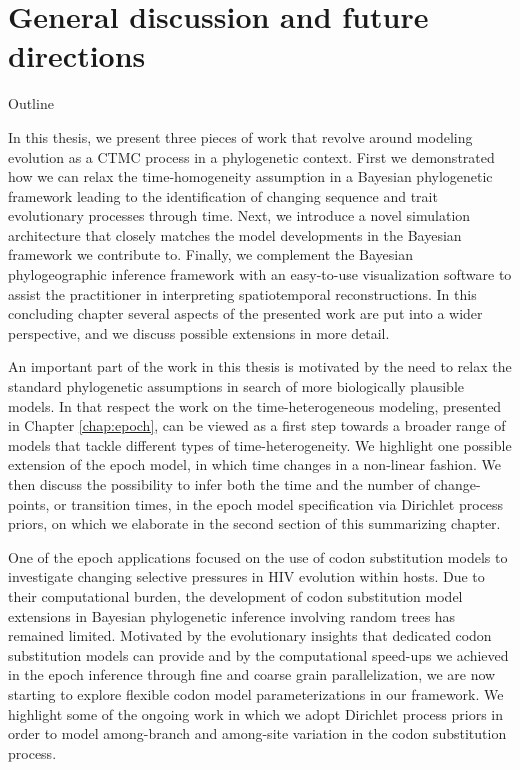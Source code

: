 \chapter{General discussion and future directions}

\begin{remark}{Outline}

In this thesis, we present three pieces of work that revolve around modeling evolution as a CTMC process in a phylogenetic context. 
First we demonstrated how we can relax the time-homogeneity assumption in a Bayesian phylogenetic framework leading to the identification of changing sequence and trait evolutionary processes through time.
Next, we introduce a novel simulation architecture that closely matches the model developments in the Bayesian framework we contribute to.
Finally, we complement the Bayesian phylogeographic inference framework with an easy-to-use visualization software to assist the practitioner in interpreting spatiotemporal reconstructions.
In this concluding chapter several aspects of the presented work are put into a wider perspective, and we discuss possible extensions in more detail. 

An important part of the work in this thesis is motivated by the need to relax the standard phylogenetic assumptions in search of more biologically plausible models. 
In that respect the work on the time-heterogeneous modeling, presented in Chapter \ref{chap:epoch}, can be viewed as a first step towards a broader range of models that tackle different types of time-heterogeneity.
We highlight one possible extension of the epoch model, in which time changes in a non-linear fashion.
We then discuss the possibility to infer both the time and the number of change-points, or transition times, in the epoch model specification via Dirichlet process priors, on which we elaborate in the second section of this summarizing chapter. 

One of the epoch applications focused on the use of codon substitution models to investigate changing selective pressures in HIV evolution within hosts.
Due to their computational burden, the development of codon substitution model extensions in Bayesian phylogenetic inference involving random trees has remained limited.
Motivated by the evolutionary insights that dedicated codon substitution models can provide and by the computational speed-ups we achieved in the epoch inference through fine and coarse grain parallelization, we are now starting to explore flexible codon model parameterizations in our framework.  
We highlight some of the ongoing work in which we adopt Dirichlet process priors in order to model among-branch and among-site variation in the codon substitution process.


\end{remark}
